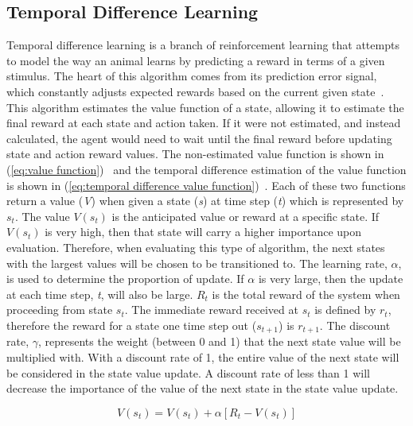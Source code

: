 \documentclass[12pt,american]{report}
\begin{document}
\subsection{Temporal Difference Learning}
Temporal difference learning is a branch of reinforcement learning that attempts to model the way an animal learns by predicting a reward in terms of a given stimulus. The heart of this algorithm comes from its prediction error signal, which constantly adjusts expected rewards based on the current given state~\cite{o2003temporal}. This algorithm estimates the value function of a state, allowing it to estimate the final reward at each state and action taken.  If it were not estimated, and instead calculated, the agent would need to wait until the final reward before updating state and action reward values. The non-estimated value function is shown in (\ref{eq:value function})~\cite{Eden} and the temporal difference estimation of the value function is shown in (\ref{eq:temporal difference value function})~\cite{Eden}. Each of these two functions return a value (\textit{V}) when given a state (\textit{s}) at time step (\textit{t}) which is represented by \textit{$s_t$}. The value \textit{$V(s_t)$} is the anticipated value or reward at a specific state.  If \textit{$V(s_t)$} is very high, then that state will carry a higher importance upon evaluation. Therefore, when evaluating this type of algorithm, the next states with the largest values will be chosen to be transitioned to. The learning rate, \textit{$\alpha$}, is used to determine the proportion of update.  If \textit{$\alpha$} is very large, then the update at each time step, \textit{t}, will also be large.  \textit{$R_t$} is the total reward of the system when proceeding from state \textit{$s_t$}. The immediate reward received at \textit{$s_t$} is defined by \textit{$r_t$}, therefore the reward for a state one time step out (\textit{$s_{t+1}$}) is \textit{$r_{t+1}$}. The discount rate, \textit{$\gamma$}, represents the weight (between 0 and 1) that the next state value will be multiplied with.  With a discount rate of 1, the entire value of the next state will be considered in the state value update. A discount rate of less than 1 will decrease the importance of the value of the next state in the state value update.
        
        \begin{equation}
            \label{eq:value function}
            V(s_{t}) = V(s_{t}) + \alpha[R_{t}-V(s_{t})]
        \end{equation}
        
\end{document}
